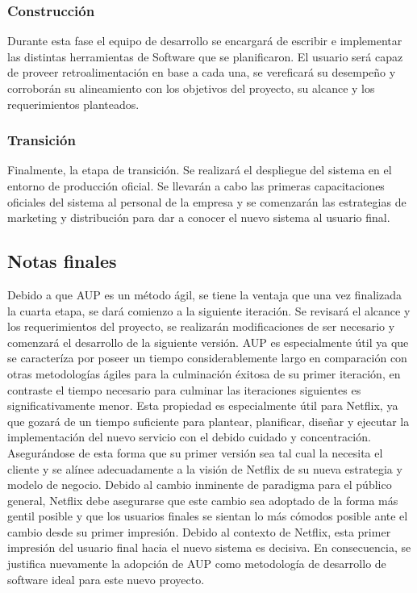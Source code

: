 \documentclass{article}
\begin{document}
\subsubsection{Construcción}
Durante esta fase el equipo de desarrollo
se encargará de escribir e implementar las distintas herramientas
de Software que se planificaron. El usuario será capaz de proveer
retroalimentación en base a cada una, se vereficará su desempeño
y corroborán su alineamiento con los objetivos del proyecto, 
su alcance y los requerimientos planteados.
\subsubsection{Transición}
Finalmente, la etapa de transición. Se realizará el despliegue del
sistema en el entorno de producción oficial. Se llevarán a cabo las
primeras capacitaciones oficiales del sistema al personal de la
empresa y se comenzarán las estrategias de marketing y distribución
para dar a conocer el nuevo sistema al usuario final.
\subsection{Notas finales}
Debido a que AUP es un método ágil, se tiene la ventaja que 
una vez finalizada la cuarta etapa, se dará comienzo a la siguiente
iteración. Se revisará el alcance y los requerimientos del proyecto,
se realizarán modificaciones de ser necesario y comenzará el
desarrollo de la siguiente versión. AUP es especialmente útil ya que
se caracteríza por poseer un tiempo considerablemente largo en 
comparación con otras metodologías ágiles para la culminación 
éxitosa de su primer iteración, en contraste el tiempo necesario 
para culminar las iteraciones siguientes es significativamente menor.
Esta propiedad es especialmente útil para Netflix, ya que gozará 
de un tiempo suficiente para plantear, planificar, diseñar y ejecutar
la implementación del nuevo servicio con el debido cuidado y 
concentración. Asegurándose de esta forma que su primer versión sea tal
cual la necesita el cliente y se alínee adecuadamente a la visión de Netflix de 
su nueva estrategia y modelo de negocio. Debido al cambio 
inminente de paradigma para el público general, Netflix debe
asegurarse que este cambio sea adoptado de la forma más gentil posible
y que los usuarios finales se sientan lo más cómodos posible ante
el cambio desde su primer impresión. Debido al contexto de Netflix,
esta primer impresión del usuario final hacia el nuevo sistema es
decisiva. En consecuencia, se justifica nuevamente la adopción de AUP
como metodología de desarrollo de software ideal para este nuevo proyecto.
\end{document}
